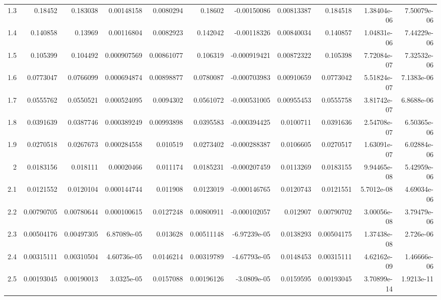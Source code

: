 {\begin{tabular}{rrrrrrrrrrr}
  1.3         & 0.18452    & 0.183038   &   0.00148158  &    0.0080294  & 0.18602    &  -0.00150086  &    0.00813387 & 0.184518   &   1.38404e-06 &   7.50079e-06 \\
  1.4         & 0.140858   & 0.13969    &   0.00116804  &    0.0082923  & 0.142042   &  -0.00118326  &    0.00840034 & 0.140857   &   1.04831e-06 &   7.44229e-06 \\
  1.5         & 0.105399   & 0.104492   &   0.000907569 &    0.00861077 & 0.106319   &  -0.000919421 &    0.00872322 & 0.105398   &   7.72084e-07 &   7.32532e-06 \\
  1.6         & 0.0773047  & 0.0766099  &   0.000694874 &    0.00898877 & 0.0780087  &  -0.000703983 &    0.00910659 & 0.0773042  &   5.51824e-07 &   7.1383e-06  \\
  1.7         & 0.0555762  & 0.0550521  &   0.000524095 &    0.0094302  & 0.0561072  &  -0.000531005 &    0.00955453 & 0.0555758  &   3.81742e-07 &   6.8688e-06  \\
  1.8         & 0.0391639  & 0.0387746  &   0.000389249 &    0.00993898 & 0.0395583  &  -0.000394425 &    0.0100711  & 0.0391636  &   2.54708e-07 &   6.50365e-06 \\
  1.9         & 0.0270518  & 0.0267673  &   0.000284558 &    0.010519   & 0.0273402  &  -0.000288387 &    0.0106605  & 0.0270517  &   1.63091e-07 &   6.02884e-06 \\
  2           & 0.0183156  & 0.018111   &   0.00020466  &    0.011174   & 0.0185231  &  -0.000207459 &    0.0113269  & 0.0183155  &   9.94465e-08 &   5.42959e-06 \\
  2.1         & 0.0121552  & 0.0120104  &   0.000144744 &    0.011908   & 0.0123019  &  -0.000146765 &    0.0120743  & 0.0121551  &   5.7012e-08  &   4.69034e-06 \\
  2.2         & 0.00790705 & 0.00780644 &   0.000100615 &    0.0127248  & 0.00800911 &  -0.000102057 &    0.012907   & 0.00790702 &   3.00056e-08 &   3.79479e-06 \\
  2.3         & 0.00504176 & 0.00497305 &   6.87089e-05 &    0.013628   & 0.00511148 &  -6.97239e-05 &    0.0138293  & 0.00504175 &   1.37438e-08 &   2.726e-06   \\
  2.4         & 0.00315111 & 0.00310504 &   4.60736e-05 &    0.0146214  & 0.00319789 &  -4.67793e-05 &    0.0148453  & 0.00315111 &   4.62162e-09 &   1.46666e-06 \\
  2.5         & 0.00193045 & 0.00190013 &   3.0325e-05  &    0.0157088  & 0.00196126 &  -3.0809e-05  &    0.0159595  & 0.00193045 &   3.70899e-14 &   1.9213e-11  \\
\hline
\end{tabular}
}
